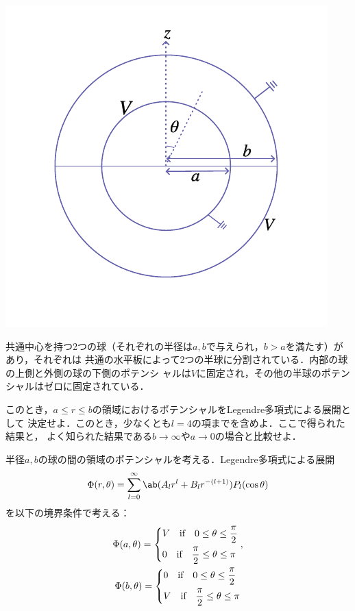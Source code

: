 \begin{bx1}
  \begin{wrapstuff}[type=figure,r,lines=7,width=0.23\linewidth]
    \includegraphics[width=\linewidth]{fig/Jackson3-1.pdf}%
  \end{wrapstuff}
  共通中心を持つ2つの球（それぞれの半径は$a, b$で与えられ，$b>a$を満たす）があり，それぞれは
  共通の水平板によって2つの半球に分割されている．内部の球の上側と外側の球の下側のポテンシ
  ャルは$V$に固定され，その他の半球のポテンシャルはゼロに固定されている．

  このとき，$a \leq r \leq b$の領域におけるポテンシャルをLegendre多項式による展開として
  決定せよ．このとき，少なくとも$l = 4$の項までを含めよ．ここで得られた結果と，
  よく知られた結果である$b \to \infty$や$a \to 0$の場合と比較せよ．
\end{bx1}
半径$a, b$の球の間の領域のポテンシャルを考える．Legendre多項式による展開
\begin{gather}%
  \Phi(r, \theta) = \sum_{l=0}^\infty \ab(A_l r^l + B_l r^{-(l+1)}) P_l (\cos\theta)
\end{gather}
を以下の境界条件で考える：
\begin{gather}%
  \label{eq:prob3-1_bc1}
  \Phi(a,\theta) =
  \begin{dcases}%
    V \qqtext{if} 0 \leq \theta \leq \frac{\pi}{2}\\
    0 \qqtext{if} \frac{\pi}{2} \leq \theta \leq \pi
  \end{dcases},\\
  \label{eq:prob3-1_bc2}
  \Phi(b,\theta) =
  \begin{dcases}%
    0 \qqtext{if} 0 \leq \theta \leq \frac{\pi}{2}\\
    V \qqtext{if} \frac{\pi}{2} \leq \theta \leq \pi
  \end{dcases}%
\end{gather}%
